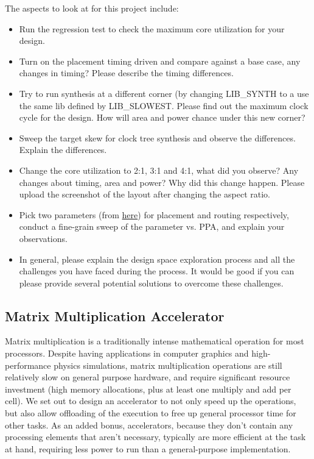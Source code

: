 \documentclass[a4paper,12pt,twoside]{article}
\begin{document}
The aspects to look at for this project include: 
\begin{itemize}
    \item Run the regression test to check the maximum core utilization for your design.
    \item Turn on the placement timing driven and compare against a base case, any changes in timing? Please describe the timing differences.
    \item Try to run synthesis at a different corner (by changing LIB\_SYNTH to a use the same lib defined by LIB\_SLOWEST. Please find out the maximum clock cycle for the design. How will area and power chance under this new corner?
    \item Sweep the target skew for clock tree synthesis and observe the differences. Explain the differences.
    \item Change the core utilization to 2:1, 3:1 and 4:1, what did you observe? Any changes about timing, area and power? Why did this change happen. Please upload the screenshot of the layout after changing the aspect ratio.
    \item Pick two parameters (from \href{https://github.com/efabless/openlane/blob/master/configuration/README.md}{here}) for placement and routing respectively, conduct a fine-grain sweep of the parameter vs. PPA, and explain your observations. 
    \item In general, please explain the design space exploration process and all the challenges you have faced during the process. It would be good if you can please provide several potential solutions to overcome these challenges.   
\end{itemize}

\subsection{Matrix Multiplication Accelerator}
Matrix multiplication is a traditionally intense mathematical operation for most processors. Despite having applications in computer graphics and high-performance physics simulations, matrix multiplication operations are still relatively slow on general purpose hardware, and require significant resource investment (high memory allocations, plus at least one multiply and add per cell). We set out to design an accelerator to not only speed up the operations, but also allow offloading of the execution to free up general processor time for other tasks. As an added bonus, accelerators, because they don't contain any processing elements that aren't necessary, typically are more efficient at the task at hand, requiring less power to run than a general-purpose implementation.
\end{document}

